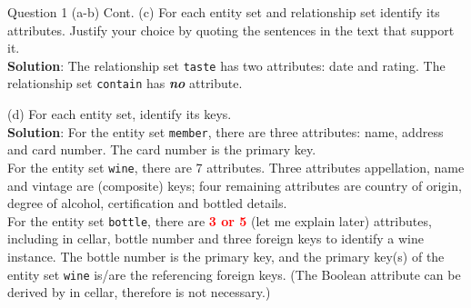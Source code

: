 \begin{frame}[fragile]{Question 1 (a-b) Cont.}
(c) For each entity set and relationship set identify its attributes. Justify your choice by quoting the sentences in the text that support it.\\ \vspace{5pt}
\textbf{Solution}: The relationship set \texttt{taste} has two attributes: date and rating. The relationship set \texttt{contain} has \textbf{\textit{no}} attribute. \\ \vspace{10pt}
	
(d) For each entity set, identify its keys.\\ \vspace{5pt}
\textbf{Solution}: For the entity set \texttt{member}, there are three attributes: name, address and card number. The card number is the primary key.\\\vspace{3pt}
For the entity set \texttt{wine}, there are 7 attributes. Three attributes appellation, name and vintage are (composite) keys; four remaining attributes are country of origin, degree of alcohol, certification and bottled details.\\\vspace{3pt}
For the entity set \texttt{bottle}, there are \textcolor{red}{\textbf{3 or 5}} (let me explain later) attributes, including in cellar, bottle number and three foreign keys to identify a wine instance. The bottle number is the primary key, and the primary key(s) of the entity set \texttt{wine} is/are the referencing foreign keys. (The Boolean attribute can be derived by in cellar, therefore is not necessary.)
\end{frame}

